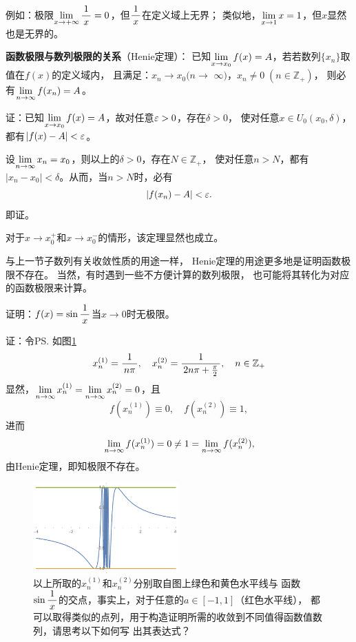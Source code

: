 例如：极限$\lim\limits_{x\to{+\infty}}\displaystyle\frac{\,{1}\,}{\,{x}\,}=0$，但$\displaystyle\frac{\,{1}\,}{\,{x}\,}$在定义域上无界；
类似地，$\lim\limits_{x\to{1}}x=1$，但$x$显然也是无界的。

\bs
{} 
\begin{thx}
	{\bf 函数极限与数列极限的关系}（{\kaishu Henie定理}）：
	已知$\lim\limits_{x\to{x_0}}f(x)=A$，若若数列$\{x_n\}$取值在$f(x)$的定义域内，
	且满足：$x_n\to x_0(n\to$ $\infty)$，$x_n\ne 0\;
	(n\in\mathbb{Z}_+)$，
	则必有$\lim\limits_{n\to\infty} f(x_n)=A$。
\end{thx}

证：已知$\lim\limits_{x\to{x_0}}f(x)=A$，故对任意$\varepsilon>0$，存在$\delta>0$，
使对任意$x\in U_0(x_0,\delta)$，都有$|f(x)-A|<\varepsilon$。

设$\lim\limits_{n\to\infty} x_n=x_0$，则以上的$\delta>0$，存在$N\in\mathbb{Z}_+$，
使对任意$n>N$，都有$|x_n-x_0|<\delta$。从而，当$n>N$时，必有
$$|f(x_n)-A|<\varepsilon.$$
即证。\fin

对于$x\to x_0^+$和$x\to x_0^-$的情形，该定理显然也成立。

与上一节子数列有关收敛性质的用途一样，
Henie定理的用途更多地是证明函数极限不存在。
当然，有时遇到一些不方便计算的数列极限，
也可能将其转化为对应的函数极限来计算。

\bs
\egz 证明：$f(x)=\sin\displaystyle\frac{\,{1}\,}{\,{x}\,}$当$x\to 0$时无极限。

证：令\ps{如图\ref{fig:sin1x1-1}}
$$x^{(1)}_n=\displaystyle\frac{\,{1}\,}{\,{n\pi}\,},\quad
x^{(2)}_n=\displaystyle\frac{\,{1}\,}{\,{2n\pi+\frac{\pi}2}\,},\quad n\in\mathbb{Z}_+$$ 
显然，$\lim\limits_{n\to\infty} x^{(1)}_n=\lim\limits_{n\to\infty} x^{(2)}_n=0$，且
$$f(x^{(1)}_n)\equiv0,\quad f(x^{(2)}_n)\equiv1,$$
进而
$$\lim\limits_{n\to\infty} f(x^{(1)}_n)=0\ne1=\lim\limits_{n\to\infty} f(x^{(2)}_n),$$
由Henie定理，即知极限不存在。\fin

\begin{figure}[h]
	\centering
	\includegraphics[width=0.5\textwidth]{./Images/Ch01/sin1x.pdf}
	\caption{以上所取的$x^{(1)}_n$和$x^{(2)}_n$分别取自图上绿色和黄色水平线与
	函数$\sin\displaystyle\frac{\,{1}\,}{\,{x}\,}$的交点，事实上，对于任意的$a\in[-1,1]$（红色水平线），
	都可以取得类似的点列，用于构造证明所需的收敛到不同值得函数值数列，请思考以下如何写
	出其表达式？}
	\label{fig:sin1x1-1}
\end{figure}

